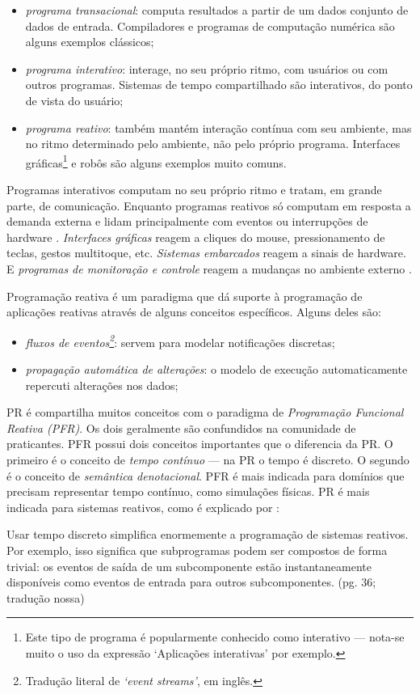 \begin{itemize}
\item \emph{programa transacional}: computa resultados a partir de um dados conjunto de
dados de entrada. Compiladores e programas de computação numérica são alguns
exemplos clássicos;
\item \emph{programa interativo}: interage, no seu próprio ritmo, com usuários ou com
outros programas. Sistemas de tempo compartilhado são interativos, do ponto
de vista do usuário;
\item \emph{programa reativo}: também mantém interação contínua com seu ambiente, mas
no ritmo determinado pelo ambiente, não pelo próprio programa. Interfaces
gráficas\footnote{Este tipo de programa é popularmente conhecido como interativo — nota-se muito o
uso da expressão ‘Aplicações interativas’ por exemplo.} e robôs são alguns exemplos muito comuns.
\end{itemize}

Programas interativos computam no seu próprio ritmo e tratam, em grande parte,
de comunicação.
Enquanto programas reativos só computam em resposta a demanda externa e lidam
principalmente com eventos ou interrupções de hardware \cite{berry1989}.
\emph{Interfaces gráficas} reagem a cliques do mouse, pressionamento de teclas,
gestos multitoque, etc.
\emph{Sistemas embarcados} reagem a sinais de hardware.
E \emph{programas de monitoração e controle} reagem a mudanças no ambiente externo
\cite{salvaneschi2015}.

Programação reativa é um paradigma que dá suporte à programação de aplicações
reativas através de alguns conceitos específicos.
Alguns deles são:

\begin{itemize}
\item \emph{fluxos de eventos\footnote{Tradução literal de \emph{‘event streams’}, em inglês.}}: servem para modelar notificações
discretas;
\item \emph{propagação automática de alterações}: o modelo de execução automaticamente
repercuti alterações nos dados;
\end{itemize}

PR é compartilha muitos conceitos com o paradigma de \emph{Programação Funcional
Reativa (PFR)}.
Os dois geralmente são confundidos na comunidade de praticantes.
PFR possui dois conceitos importantes que o diferencia da PR.
O primeiro é o conceito de \emph{tempo contínuo} — na PR o tempo é discreto.
O segundo é o conceito de \emph{semântica denotacional}.
PFR é mais indicada para domínios que precisam representar tempo contínuo,
como simulações físicas.
PR é mais indicada para sistemas reativos, como é explicado por
\textcite{roy2009}:

\begin{citacao}
  Usar tempo discreto simplifica enormemente a programação de sistemas reativos.
  Por exemplo, isso significa que subprogramas podem ser compostos de forma
  trivial: os eventos de saída de um subcomponente estão instantaneamente
  disponíveis como eventos de entrada para outros subcomponentes.
  (pg. 36; tradução nossa)
\end{citacao}

